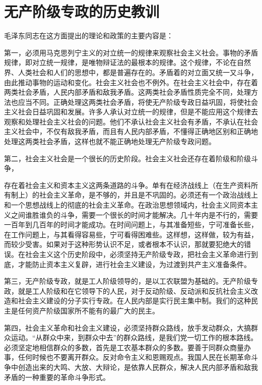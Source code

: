 \section[无产阶级专政的历史教训（一九六四年七月十四日）]{无产阶级专政的历史教训}


毛泽东同志在这方面提出的理论和政策的主要内容是：

第一，必须用马克思列宁主义的对立统一的规律来观察社会主义社会。事物的矛盾规律，即对立统一规律，是唯物辩证法的最根本的规律。这个规律，不论在自然界、人类社会和人们的思想中，都是普遍存在的。矛盾着的对立面又统一又斗争，由此推动事物的运动和变化。社会主义社会也不例外。在社会主义社会中，存在着两类社会矛盾，人民内部矛盾和敌我矛盾。这两类社会矛盾性质完全不同，处理方法也应当不同。正确处理这两类社会矛盾，将使无产阶级专政日益巩固，将使社会主义社会日益巩固和发展。许多人承认对立统一的规律，但是不能应用这个规律去观察和处理社会主义社会的问题。他们不承认社会主义社会有矛盾，不承认在社会主义社会中，不仅有敌我矛盾，而且有人民内部矛盾，不懂得正确地区别和正确地处理这两类社会矛盾，这样也就不能正确地处理无产阶级专政问题。

第二，社会主义社会是一个很长的历史阶段。社会主义社会还存在着阶级和阶级斗争，

存在着社会主义和资本主义这两条道路的斗争。单有在经济战线上（在生产资料所有制上）的社会主义革命，是不够的，并且是不巩固的。必须还有一个政治战线上和一个思想战线上的彻底的社会主义革命。在政治思想领域内，社会主义同资本主义之间谁胜谁负的斗争，需要一个很长的时间才能解决。几十年内是不行的，需要一百年到几百年的时间才能成功。在时间问题上，与其准备短些，宁可准备长些，在工作问题上，与其看得容易些，宁可看得困难些。这样想，这样做，较为有益，而较少受害。如果对于这种形势认识不足，或者根本不认识，那就要犯绝大的错误。在社会主义这个历史阶段中，必须坚持无产阶级专政，把社会主义革命进行到底，才能防止资本主义复辟，进行社会主义建设，为过渡到共产主义准备条件。

第三，无产阶级专政，就是工人阶级领导的，是以工农联盟为基础的。无产阶级专政，就是工人阶级和在它领导下的人民，对于反动阶级、反动派和反抗社会主义改造和社会主义建设的分子实行专政。在人民内部是实行民主集中制。我们的这种民主是任何资产阶级国家所不能有的最广大的民主。

第四，社会主义革命和社会主义建设，必须坚持群众路线，放手发动群众，大搞群众运动。“从群众中来，到群众中去”的群众路线，是我们党一切工作的根本路线。必须坚定地相信群众的多数，首先是工农基本群众的多数。要善于同群众商量办事，任何时候也不要离开群众。反对命令主义和恩赐观点。我国人民在长期革命斗争中创造出来的大鸣、大放、大辩论，是依靠人民群众，解决人民内部矛盾和敌我矛盾的一种重要的革命斗争形式。

